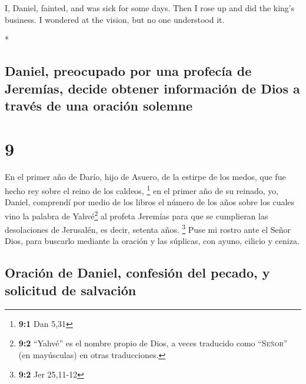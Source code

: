 \begin{paracol}{2}
\begin{otherlanguage}{english}
 I, Daniel, fainted, and was sick for some days. Then I
rose up and did the king's business. I wondered at the vision, but no
one understood it.

\end{otherlanguage}

\switchcolumn[0]*

\hypertarget{daniel-preocupado-por-una-profecuxeda-de-jeremuxedas-decide-obtener-informaciuxf3n-de-dios-a-travuxe9s-de-una-oraciuxf3n-solemne}{%
\subsection{Daniel, preocupado por una profecía de Jeremías, decide
obtener información de Dios a través de una oración
solemne}\label{daniel-preocupado-por-una-profecuxeda-de-jeremuxedas-decide-obtener-informaciuxf3n-de-dios-a-travuxe9s-de-una-oraciuxf3n-solemne}}

\hypertarget{section-16}{%
\section{9}\label{section-16}}

 En el primer año de Darío, hijo de Asuero, de la estirpe
de los medos, que fue hecho rey sobre el reino de los caldeos,
\footnote{\textbf{9:1} Dan 5,31}  en el primer año de su
reinado, yo, Daniel, comprendí por medio de los libros el número de los
años sobre los cuales vino la palabra de Yahvé\footnote{\textbf{9:2}
  ``Yahvé'' es el nombre propio de Dios, a veces traducido como
  ``\textsc{Señor}'' (en mayúsculas) en otras traducciones.} al profeta
Jeremías para que se cumplieran las desolaciones de Jerusalén, es decir,
setenta años. \footnote{\textbf{9:2} Jer 25,11-12}  Puse
mi rostro ante el Señor Dios, para buscarlo mediante la oración y las
súplicas, con ayuno, cilicio y ceniza.

\hypertarget{oraciuxf3n-de-daniel-confesiuxf3n-del-pecado-y-solicitud-de-salvaciuxf3n}{%
\subsection{Oración de Daniel, confesión del pecado, y solicitud de
salvación}\label{oraciuxf3n-de-daniel-confesiuxf3n-del-pecado-y-solicitud-de-salvaciuxf3n}}


\end{paracol}
